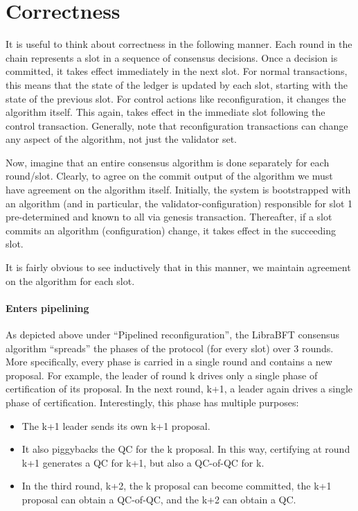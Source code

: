 \section{Correctness} \label{correctness}

It is useful to think about correctness in the following manner. Each round in the chain represents a slot in a sequence of consensus decisions.
Once a decision is committed, it takes effect immediately in the next slot. For normal transactions, this means that the state of the ledger is
updated by each slot, starting with the state of the previous slot. For control actions like reconfiguration, it changes the algorithm itself.
This again, takes effect in the immediate slot following the control transaction.
Generally, note that reconfiguration transactions can change any aspect of the algorithm, not just the validator set.

Now, imagine that an entire consensus algorithm is done separately for each round/slot. Clearly, to agree on the commit output of the algorithm
we must have agreement on the algorithm itself. Initially, the system is bootstrapped with an algorithm (and in particular, the
validator-configuration) responsible for slot 1 pre-determined and known to all via genesis transaction. Thereafter, if a slot commits an algorithm (configuration) change,
it takes effect in the succeeding slot.

It is fairly obvious to see inductively that in this manner, we maintain agreement on the algorithm for each slot.

\paragraph{Enters pipelining}

As depicted above under “Pipelined reconfiguration”, the LibraBFT consensus algorithm “spreads” the phases of the protocol (for every slot) over
3 rounds. More specifically, every phase is carried in a single round and contains a new proposal. For example, the leader of round k drives only
a single phase of certification of its proposal. In the next round, k+1, a leader again drives a single phase of certification. Interestingly,
this phase has multiple purposes:
\begin{itemize}
\item The k+1 leader sends its own k+1 proposal.
\item It also piggybacks the QC for the k proposal. In this way, certifying at round k+1 generates a QC for k+1, but also a QC-of-QC for k.
\item In the third round, k+2, the k proposal can become committed, the k+1 proposal can obtain a QC-of-QC, and the k+2 can obtain a QC.
\end{itemize}

